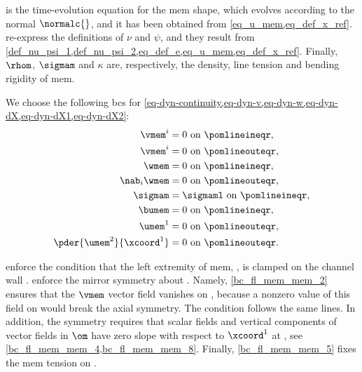 %
 is the time-evolution equation for the \ac{mem} shape, which evolves according to the normal $\normalc{}$, and it has been obtained from  \cref{eq_u_mem,eq_def_x_ref}.
 re-express the definitions of $\nu$ and $\psi$, and they result from \cref{def_nu_psi_1,def_nu_psi_2,eq_def_e,eq_u_mem,eq_def_x_ref}.
Finally, $\rhom$, $\sigmam$ and $\kappa$ are, respectively, the density, line tension and bending rigidity of \ac{mem}.



We choose the following \acp{bc} for \cref{eq-dyn-continuity,eq-dyn-v,eq-dyn-w,eq-dyn-dX,eq-dyn-dX1,eq-dyn-dX2}:
\begin{align}
    \label{bc_fl_mem_mem_1}
    \vmem^i                   & = 0 \text{ on } \pomlineineqr,        \\
    \label{bc_fl_mem_mem_2}
    \vmem^i                   & = 0 \text{ on } \pomlineouteqr,       \\
    \label{bc_fl_mem_mem_3}
    \wmem                     & = 0 \text{ on } \pomlineineqr,        \\
    \label{bc_fl_mem_mem_4}
    \nab_i \wmem              & = 0 \text{ on } \pomlineouteqr,       \\
    \label{bc_fl_mem_mem_5}
    \sigmam                   & = \sigmaml \text{ on } \pomlineineqr, \\
    \label{bc_fl_mem_mem_6}
    \bumem                    & = 0 \text{ on } \pomlineineqr,        \\
    \label{bc_fl_mem_mem_7}
    \umem^1                   & = 0 \text{ on } \pomlineouteqr,       \\
    \label{bc_fl_mem_mem_8}
    \pder{\umem^2}{\xcoord^1} & = 0 \text{ on } \pomlineouteqr.
\end{align}

 enforce the condition that the left extremity of \ac{mem}, \pomlinein, is clamped on the channel wall \pomin.
%
 enforce the mirror symmetry about \pomout.
Namely, \cref{bc_fl_mem_mem_2} ensures that the $\vmem$ vector field vanishes on \pomlineout, because a nonzero value of this field on \pomout{}  would break the axial symmetry. The condition  follows the same lines. In addition, the  symmetry requires that scalar fields and vertical components of vector fields in $\om$ have zero slope with respect to $\xcoord^1$ at \pomlineout{}, see \cref{bc_fl_mem_mem_4,bc_fl_mem_mem_8}.
Finally, \cref{bc_fl_mem_mem_5} fixes the \ac{mem} tension on \pomlinein.




